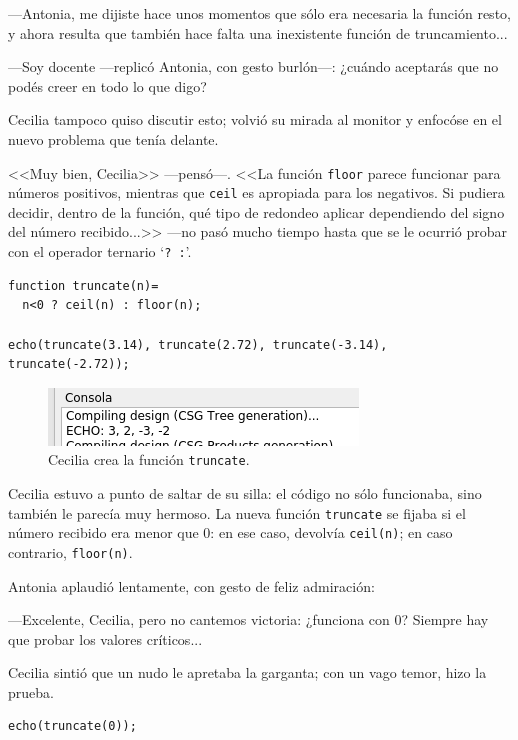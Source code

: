 ---Antonia, me dijiste hace unos momentos que sólo era necesaria la
función resto, y ahora resulta que también hace falta una inexistente
función de truncamiento...

---Soy docente ---replicó Antonia, con gesto burlón---: ¿cuándo
aceptarás que no podés creer en todo lo que digo?

Cecilia tampoco quiso discutir esto; volvió su mirada al monitor y
enfocóse en el nuevo problema que tenía delante.

<<Muy bien, Cecilia>> ---pensó---. <<La función \lstinline!floor!
parece funcionar para números positivos, mientras que \lstinline!ceil!
es apropiada para los negativos. Si pudiera decidir, dentro de la
función, qué tipo de redondeo aplicar dependiendo del signo del número
recibido...>> ---no pasó mucho tiempo hasta que se le ocurrió probar
con el operador ternario `\lstinline!? :!'.

\begin{lstlisting}
function truncate(n)=
  n<0 ? ceil(n) : floor(n);

echo(truncate(3.14), truncate(2.72), truncate(-3.14), truncate(-2.72));
\end{lstlisting}

\begin{figure}[ht]
  \centering \includegraphics[width=.6\textwidth]{imagenes/truncate-1}
  \caption[Función \lstinline!truncate!]{Cecilia crea la función
    \lstinline!truncate!.}
  \label{fig:truncate-1}
\end{figure}


Cecilia estuvo a punto de saltar de su silla: el código no sólo
funcionaba, sino también le parecía muy hermoso. La nueva función
\lstinline!truncate!  se fijaba si el número recibido era menor que 0:
en ese caso, devolvía \lstinline!ceil(n)!; en caso contrario,
\lstinline!floor(n)!.

Antonia aplaudió lentamente, con gesto de feliz ad\-mi\-ra\-ción:

---Excelente, Cecilia, pero no cantemos victoria: ¿funciona con 0?
Siempre hay que probar los valores críticos...

Cecilia sintió que un nudo le apretaba la garganta; con un vago temor,
hizo la prueba.

\begin{lstlisting}
echo(truncate(0));
\end{lstlisting}

